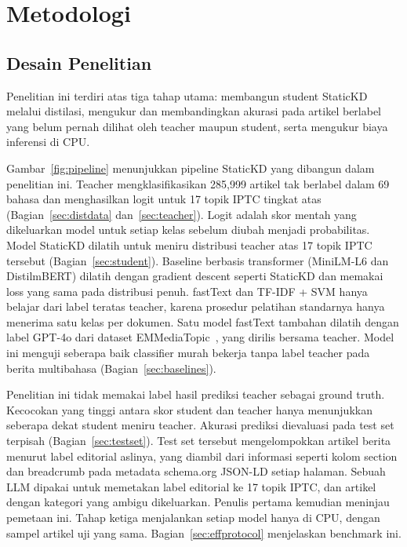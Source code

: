 \documentclass[journal]{IEEEtran}
\begin{document}
\section{Metodologi}
\label{sec:method}
\subsection{Desain Penelitian}
Penelitian ini terdiri atas tiga tahap utama: membangun student StaticKD melalui distilasi, mengukur dan membandingkan akurasi pada artikel berlabel yang belum pernah dilihat oleh teacher maupun student, serta mengukur biaya inferensi di CPU.

Gambar~\ref{fig:pipeline} menunjukkan pipeline StaticKD yang dibangun dalam penelitian ini. Teacher mengklasifikasikan 285,999 artikel tak berlabel dalam 69 bahasa dan menghasilkan logit untuk 17 topik IPTC tingkat atas (Bagian~\ref{sec:distdata} dan~\ref{sec:teacher}). Logit adalah skor mentah yang dikeluarkan model untuk setiap kelas sebelum diubah menjadi probabilitas. Model StaticKD dilatih untuk meniru distribusi teacher atas 17 topik IPTC tersebut (Bagian~\ref{sec:student}). Baseline berbasis transformer (MiniLM-L6 dan DistilmBERT) dilatih dengan gradient descent seperti StaticKD dan memakai loss yang sama pada distribusi penuh. fastText dan TF-IDF + SVM hanya belajar dari label teratas teacher, karena prosedur pelatihan standarnya hanya menerima satu kelas per dokumen. Satu model fastText tambahan dilatih dengan label GPT-4o dari dataset EMMediaTopic~\cite{emmediatopic2025}, yang dirilis bersama teacher. Model ini menguji seberapa baik classifier murah bekerja tanpa label teacher pada berita multibahasa (Bagian~\ref{sec:baselines}).

Penelitian ini tidak memakai label hasil prediksi teacher sebagai ground truth. Kecocokan yang tinggi antara skor student dan teacher hanya menunjukkan seberapa dekat student meniru teacher. Akurasi prediksi dievaluasi pada test set terpisah (Bagian~\ref{sec:testset}). Test set tersebut mengelompokkan artikel berita menurut label editorial aslinya, yang diambil dari informasi seperti kolom section dan breadcrumb pada metadata schema.org JSON-LD setiap halaman. Sebuah LLM dipakai untuk memetakan label editorial ke 17 topik IPTC, dan artikel dengan kategori yang ambigu dikeluarkan. Penulis pertama kemudian meninjau pemetaan ini. Tahap ketiga menjalankan setiap model hanya di CPU, dengan sampel artikel uji yang sama. Bagian~\ref{sec:effprotocol} menjelaskan benchmark ini.
\end{document}
